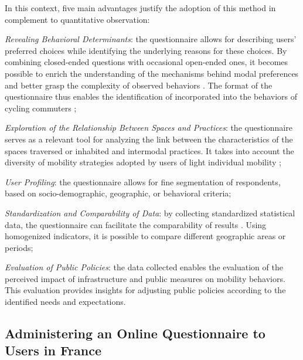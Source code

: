 \begin{refsegment}
In this context, five main advantages justify the adoption of this method in complement to quantitative observation:
    \begin{customitemize}
\item \textsl{Revealing Behavioral Determinants}: the questionnaire allows for describing users' preferred choices while identifying the underlying reasons for these choices. By combining closed-ended questions with occasional open-ended ones, it becomes possible to enrich the understanding of the mechanisms behind modal preferences and better grasp the complexity of observed behaviors \textcolor{blue}{\autocite[4, 9]{meissonnier_pour_2012}}. The format of the questionnaire thus enables the identification of  incorporated into the behaviors of cycling commuters \textcolor{blue}{\autocite[1680]{vaisey_motivation_2009}};
\item \textsl{Exploration of the Relationship Between Spaces and Practices}: the questionnaire serves as a relevant tool for analyzing the link between the characteristics of the spaces traversed or inhabited and intermodal practices. It takes into account the diversity of mobility strategies adopted by users of light individual mobility \textcolor{blue}{\autocite[2]{sebille_saisir_2024}};
\item \textsl{User Profiling}: the questionnaire allows for fine segmentation of respondents, based on socio-demographic, geographic, or behavioral criteria;
\item \textsl{Standardization and Comparability of Data}: by collecting standardized statistical data, the questionnaire can facilitate the comparability of results \textcolor{blue}{\autocite[5]{sebille_saisir_2024}}. Using homogenized indicators, it is possible to compare different geographic areas or periods;
\item \textsl{Evaluation of Public Policies}: the data collected enables the evaluation of the perceived impact of infrastructure and public measures on mobility behaviors. This evaluation provides insights for adjusting public policies according to the identified needs and expectations.
    \end{customitemize}%

\subsection{Administering an Online Questionnaire to Users in France
    \label{chap3:administration-questionnaire-usagers}
    }


\end{refsegment}
